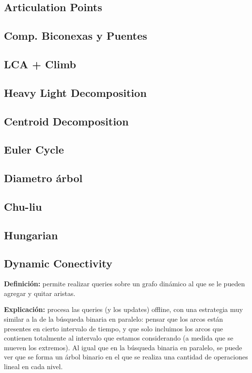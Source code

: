 {\subsection{Articulation Points}
\subsection{Comp. Biconexas y Puentes}
\subsection{LCA + Climb}
\subsection{Heavy Light Decomposition}
\subsection{Centroid Decomposition}
\subsection{Euler Cycle}
\subsection{Diametro árbol}
\subsection{Chu-liu}
\subsection{Hungarian}
\subsection{Dynamic Conectivity}
\textbf{Definición:} permite realizar queries sobre un grafo dinámico al que se le pueden agregar y quitar aristas.

\textbf{Explicación: } procesa las queries (y los updates) offline, con una estrategia muy similar a la de la búsqueda
binaria en paralelo: pensar que los arcos están presentes en cierto intervalo de tiempo, y que solo incluimos los arcos
que contienen totalmente al intervalo que estamos considerando (a medida que se mueven los extremos). Al igual
que en la búsqueda binaria en paralelo, se puede ver que se forma un árbol binario en el que se realiza una cantidad
de operaciones lineal en cada nivel.


}
